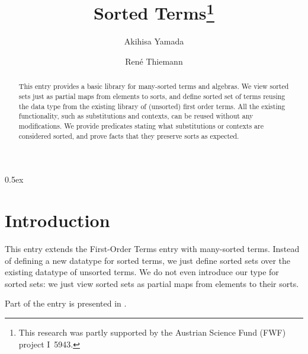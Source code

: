 \documentclass[11pt,a4paper]{article}
\begin{document}
\title{Sorted Terms\footnote{This research was partly supported by the Austrian Science Fund (FWF) project I~5943.}}
\author{Akihisa Yamada}
\author{Ren\'e Thiemann}
\maketitle

\begin{abstract}
This entry provides a basic library for many-sorted terms and algebras.
We view sorted sets just as partial maps from elements to sorts,
and define sorted set of terms reusing the data type
from the existing library of (unsorted) first order terms.
All the existing functionality, such as substitutions and contexts,
can be reused without any modifications.
We provide predicates stating what substitutions or contexts are considered sorted,
and prove facts that they preserve sorts as expected.
\end{abstract}

\tableofcontents

\parindent 0pt\parskip 0.5ex

\section{Introduction}

This entry extends the First-Order Terms \cite{First_Order_Terms-AFP}
entry with many-sorted terms.
Instead of defining a new datatype for sorted terms,
we just define sorted sets over the existing datatype of unsorted terms.
We do not even introduce our type for sorted sets:
we just view sorted sets as partial maps from elements to their sorts.

Part of the entry is presented in \cite{FSCD2024}.







\end{document}
